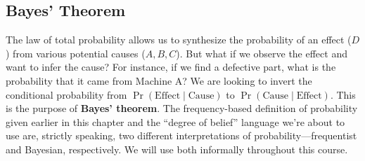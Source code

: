 \subsection{Bayes' Theorem}
The law of total probability allows us to synthesize the probability of an effect ($D$) from various potential causes ($A, B, C$). But what if we observe the effect and want to infer the cause? For instance, if we find a defective part, what is the probability that it came from Machine A? We are looking to invert the conditional probability from $\Pr(\text{Effect} \mid \text{Cause})$ to $\Pr(\text{Cause} \mid \text{Effect})$. This is the purpose of \textbf{Bayes' theorem}. The frequency-based definition of probability given earlier in this chapter and the ``degree of belief'' language we're about to use are, strictly speaking, two different interpretations of probability---frequentist and Bayesian, respectively. We will use both informally throughout this course.

